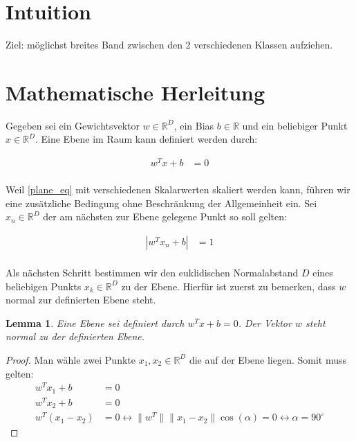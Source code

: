 \documentclass[a4paper,11pt,twoside]{scrreprt}
\newtheorem{lemma}[theorem]{Lemma}
\begin{document}
\section{Intuition}
Ziel: möglichst breites Band zwischen den 2 verschiedenen Klassen aufziehen.

\section{Mathematische Herleitung}
Gegeben sei ein Gewichtsvektor $w \in \mathbb{R}^{D}$, ein Bias $b \in \mathbb{R}$ und ein beliebiger Punkt $x \in \mathbb{R}^{D}$. Eine Ebene im Raum kann definiert werden durch:

\begin{equation} \label{plane_eq}
    \begin{aligned}
    w^{T} x + b &= 0 \\
    \end{aligned}
\end{equation}

Weil \autoref{plane_eq} mit verschiedenen Skalarwerten skaliert werden kann, führen wir eine zusätzliche Bedingung ohne Beschränkung der Allgemeinheit ein. Sei $x_{n} \in \mathbb{R}^{D}$ der am nächsten zur Ebene gelegene Punkt so soll gelten:

\begin{equation} \label{plane_normalization}
	\begin{aligned}
		|w^{T} x_{n} + b| &= 1 \\
	\end{aligned}
\end{equation}

Als nächsten Schritt bestimmen wir den euklidischen Normalabstand $D$ eines beliebigen Punkts $x_{k} \in \mathbb{R}^{D}$ zu der Ebene. Hierfür ist zuerst zu bemerken, dass $w$ normal zur definierten Ebene steht.

\begin{lemma}
	Eine Ebene sei definiert durch $w^{T} x + b = 0$. Der Vektor $w$ steht normal zu der definierten Ebene.
\end{lemma}

\begin{proof}
	Man wähle zwei Punkte $x_{1}, x_{2} \in \mathbb{R}^{D}$ die auf der Ebene liegen. Somit muss gelten:
	\begin{equation}
		\begin{aligned}
			w^{T} x_{1} + b &= 0 \\
			w^{T} x_{2} + b &= 0 \\
			w^{T} (x_{1} - x_{2}) &= 0 \leftrightarrow \lVert w^{T} \rVert \lVert x_{1} - x_{2} \rVert \cos(\alpha) = 0 \leftrightarrow \alpha = 90^{\circ}
		\end{aligned}
	\end{equation}
\end{proof}
\end{document}
